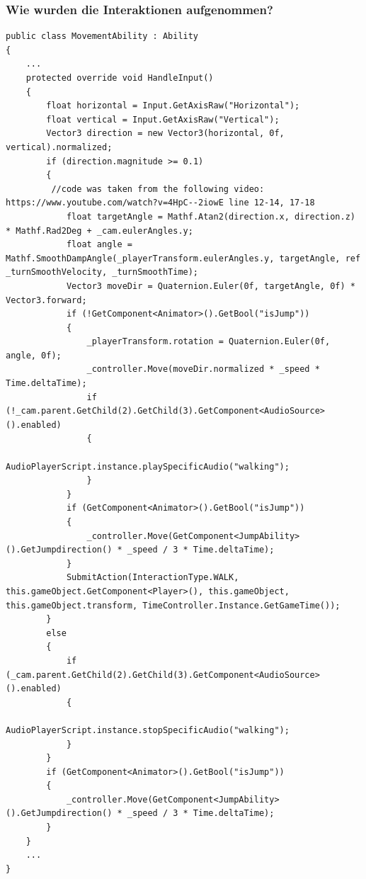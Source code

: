 \subsubsection{Wie wurden die Interaktionen aufgenommen?}\label{sec:good_05}

\begin{lstlisting}[caption={Aufnahme von Bewegungen, Ausschnitt aus MovementAbility.cs}, label={sec:movementAbility_old}]
public class MovementAbility : Ability
{
    ...
    protected override void HandleInput()
    {
        float horizontal = Input.GetAxisRaw("Horizontal");
        float vertical = Input.GetAxisRaw("Vertical");
        Vector3 direction = new Vector3(horizontal, 0f, vertical).normalized;
        if (direction.magnitude >= 0.1)
        {
         //code was taken from the following video: https://www.youtube.com/watch?v=4HpC--2iowE line 12-14, 17-18
            float targetAngle = Mathf.Atan2(direction.x, direction.z) * Mathf.Rad2Deg + _cam.eulerAngles.y;
            float angle = Mathf.SmoothDampAngle(_playerTransform.eulerAngles.y, targetAngle, ref _turnSmoothVelocity, _turnSmoothTime);
            Vector3 moveDir = Quaternion.Euler(0f, targetAngle, 0f) * Vector3.forward;
            if (!GetComponent<Animator>().GetBool("isJump"))
            {
                _playerTransform.rotation = Quaternion.Euler(0f, angle, 0f);
                _controller.Move(moveDir.normalized * _speed * Time.deltaTime);
                if (!_cam.parent.GetChild(2).GetChild(3).GetComponent<AudioSource>().enabled)
                {
                    AudioPlayerScript.instance.playSpecificAudio("walking");
                }
            }
            if (GetComponent<Animator>().GetBool("isJump"))
            {
                _controller.Move(GetComponent<JumpAbility>().GetJumpdirection() * _speed / 3 * Time.deltaTime);
            }
            SubmitAction(InteractionType.WALK, this.gameObject.GetComponent<Player>(), this.gameObject, this.gameObject.transform, TimeController.Instance.GetGameTime());
        }
        else
        {
            if (_cam.parent.GetChild(2).GetChild(3).GetComponent<AudioSource>().enabled)
            {
                AudioPlayerScript.instance.stopSpecificAudio("walking");
            }
        }
        if (GetComponent<Animator>().GetBool("isJump"))
        {
            _controller.Move(GetComponent<JumpAbility>().GetJumpdirection() * _speed / 3 * Time.deltaTime);
        }
    }
    ...
}
\end{lstlisting}

